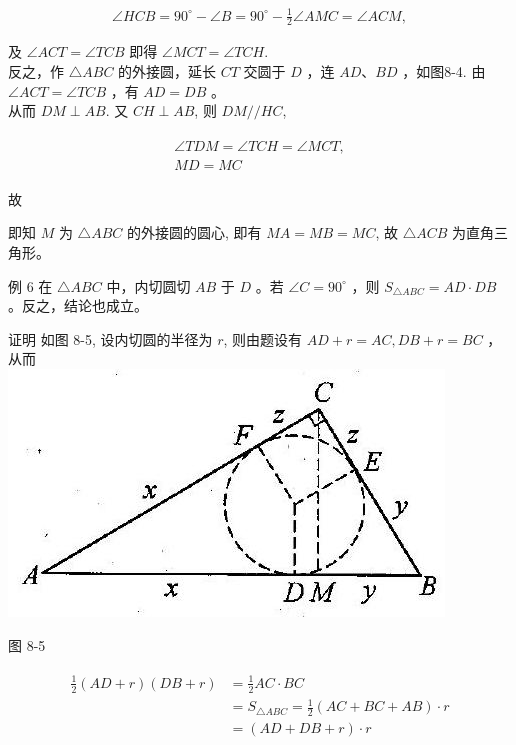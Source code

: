 \documentclass[10pt]{article}
\begin{document}
\begin{align*}
\angle H C B=90^{\circ}-\angle B=90^{\circ}-\frac{1}{2} \angle A M C=\angle A C M,
\end{align*}

及 $\angle A C T=\angle T C B$ 即得 $\angle M C T=\angle T C H$.\\
反之，作 $\triangle A B C$ 的外接圆，延长 $C T$ 交圆于 $D$ ，连 $A D 、 B D$ ，如图8-4. 由 $\angle A C T=\angle T C B$ ，有 $A D=D B$ 。\\
从而 $D M \perp A B$. 又 $C H \perp A B$, 则 $D M / / H C$,

\begin{align*}
\begin{gathered}
\angle T D M=\angle T C H=\angle M C T, \\
M D=M C
\end{gathered}
\end{align*}

故

即知 $M$ 为 $\triangle A B C$ 的外接圆的圆心, 即有 $M A=M B=M C$, 故 $\triangle A C B$ 为直角三角形。

例 6 在 $\triangle A B C$ 中，内切圆切 $A B$ 于 $D$ 。若 $\angle C=90^{\circ}$ ，则 $S_{\triangle A B C}=A D \cdot D B$ 。反之，结论也成立。

证明 如图 8-5, 设内切圆的半径为 $r$, 则由题设有 $A D+r=A C, D B+r=B C$ ，从而\\
\includegraphics[max width=\textwidth, center]{2024_10_30_2c8f45efd4a519b08e1ag-083(1)}

图 8-5

\begin{align*}
\begin{aligned}
\frac{1}{2}(A D+r)(D B+r) & =\frac{1}{2} A C \cdot B C \\
& =S_{\triangle A B C}=\frac{1}{2}(A C+B C+A B) \cdot r \\
& =(A D+D B+r) \cdot r
\end{aligned}
\end{align*}
\end{document}
